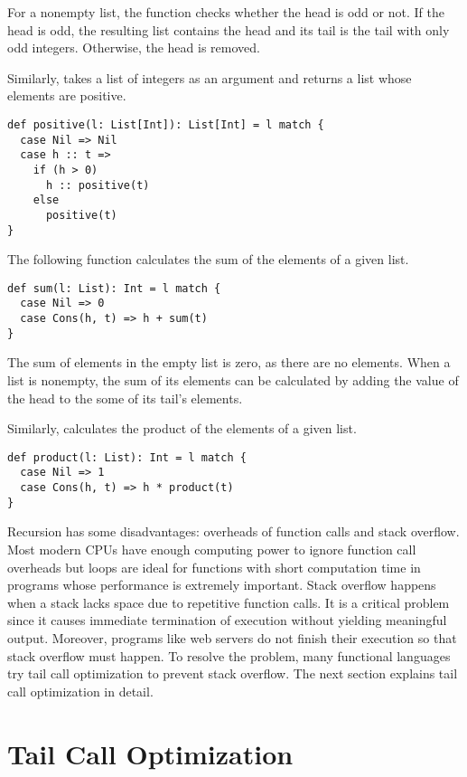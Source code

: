 For a nonempty list, the function checks whether the head is odd or not. If the
head is odd, the resulting list contains the head and its tail is the tail with
only odd integers. Otherwise, the head is removed.

Similarly,  takes a list of integers as an argument and returns a
list whose elements are positive.

\begin{verbatim}
def positive(l: List[Int]): List[Int] = l match {
  case Nil => Nil
  case h :: t =>
    if (h > 0)
      h :: positive(t)
    else
      positive(t)
}
\end{verbatim}

The following function calculates the sum of the elements of a given list.

\begin{verbatim}
def sum(l: List): Int = l match {
  case Nil => 0
  case Cons(h, t) => h + sum(t)
}
\end{verbatim}

The sum of elements in the empty list is zero, as there are no elements.
When a list is nonempty, the sum of its elements can be calculated by adding the
value of the head to the some of its tail's elements.

Similarly,  calculates the product of the elements of a given
list.

\begin{verbatim}
def product(l: List): Int = l match {
  case Nil => 1
  case Cons(h, t) => h * product(t)
}
\end{verbatim}

Recursion has some disadvantages: overheads of function calls and stack
overflow. Most modern CPUs have enough computing power to ignore function call
overheads but loops are ideal for functions with short computation time in
programs whose performance is extremely important. Stack overflow happens when a
stack lacks space due to repetitive function calls. It is a critical problem
since it causes immediate termination of execution without yielding meaningful
output. Moreover, programs like web servers do not finish their execution so that
stack overflow must happen. To resolve the problem, many functional languages try
tail call optimization to prevent stack overflow. The next section
explains tail call optimization in detail.

\section{Tail Call Optimization}

